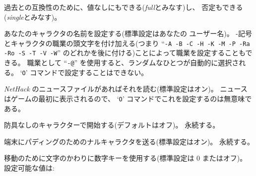 過去との互換性のために、値なしにもできる({\it full\/}とみなす)し、
否定もできる({\it single\/}とみなす)。
\item[\ib{name}]
あなたのキャラクタの名前を設定する(標準設定はあなたの ユーザー名)。
-記号とキャラクタの職業の頭文字を付け加える(つまり
``{\tt -A -B -C -H -K -M -P -Ra -Ro -S -T -V -W}''
のどれかを後に付ける)ことによって職業を設定することもできる。
職業として
``{\tt -@}''
を使用すると、ランダムなひとつが自動的に選択される。
`{\tt O}' コマンドで設定することはできない。
\item[\ib{news}]
{\it NetHack\/} のニュースファイルがあればそれを読む(標準設定はオン)。
ニュースはゲームの最初に表示されるので、
`{\tt O}' コマンドでこれを設定するのは無意味である。
\item[\ib{nudist}]
防具なしのキャラクターで開始する(デフォルトはオフ)。
永続する。
\item[\ib{null}]
端末にパディングのためのナルキャラクタを送る(標準設定はオン)。
永続する。
\item[\ib{number\verb+_+pad}]
移動のために文字のかわりに数字キーを使用する(標準設定は 0 またはオフ)。\\
設定可能な値は:

